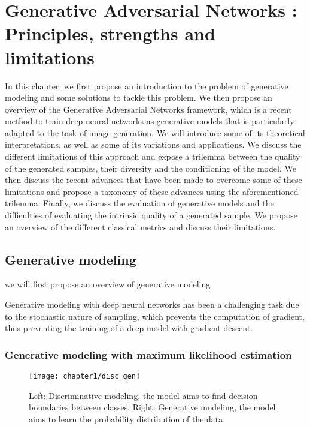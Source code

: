 \chapter{Generative Adversarial Networks : Principles, strengths and limitations}
\label{chap:chapter1}

\begin{chapterabstract}
	In this chapter, we first propose an introduction to the problem of generative modeling and some solutions to tackle this problem. We then propose an overview of the Generative Adversarial Networks \citep{Goodfellow2014} framework, which is a recent method to train deep neural networks as generative models that is particularly adapted to the task of image generation. We will introduce some of its theoretical interpretations, as well as some of its variations and applications. We discuss the different limitations of this approach and expose a trilemma between the quality of the generated samples, their diversity and the conditioning of the model. We then discuss the recent advances that have been made to overcome some of these limitations and propose a taxonomy of these advances using the aforementioned trilemma. Finally, we discuss the evaluation of generative models and the difficulties of evaluating the intrinsic quality of a generated sample.  We propose an overview of the different classical metrics and discuss their limitations.
\end{chapterabstract}

\minitoc
\newpage

\section{Generative modeling}
we will first propose an overview of generative modeling

Generative modeling with deep neural networks has been a challenging task due to the stochastic nature of sampling, which prevents the computation of gradient, thus preventing the training of a deep model with gradient descent.  %

\subsection{Generative modeling with maximum likelihood estimation}

\begin{figure}
	\centering
	\texttt{[image: chapter1/disc\_gen]}
	\caption[Generative modeling]{Left: Discriminative modeling, the model aims to find decision boundaries between classes. Right: Generative modeling, the model aims to learn the probability distribution of the data.}
	\label{fig:disc_gen}
\end{figure}

